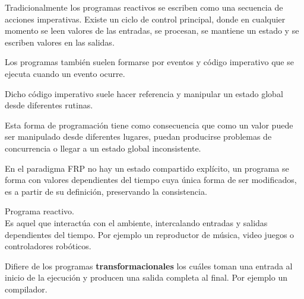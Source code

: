 
Tradicionalmente los programas reactivos
se escriben como una secuencia de acciones imperativas.
Existe un ciclo de control principal, donde en cualquier
momento se leen valores de las entradas, se procesan,
se mantiene un estado y se escriben valores en las salidas.

Los programas también suelen formarse por eventos
y código imperativo que se ejecuta cuando un evento ocurre.

Dicho código imperativo suele hacer referencia y manipular
un estado global desde diferentes rutinas.

Esta forma de programación tiene como consecuencia que
como un valor puede ser manipulado desde diferentes lugares,
puedan producirse problemas de concurrencia o llegar a un
estado global inconsistente.

En el paradigma FRP no hay un estado compartido explícito,
un programa se forma con valores dependientes del tiempo
cuya única forma de ser modificados,
es a partir de su definición, preservando la consistencia.

\begin{definicion}
Programa reactivo.\\
Es aquel que interactúa con el ambiente, intercalando entradas
y salidas dependientes del tiempo. Por ejemplo un reproductor
de música, video juegos o controladores robóticos.

Difiere de los programas \textbf{transformacionales} los cuáles
toman una entrada al inicio de la ejecución y producen una salida
completa al final. Por ejemplo un compilador.
\end{definicion}


